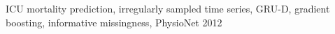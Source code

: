 ICU mortality prediction, irregularly sampled time series, GRU-D, gradient boosting, informative missingness, PhysioNet 2012
